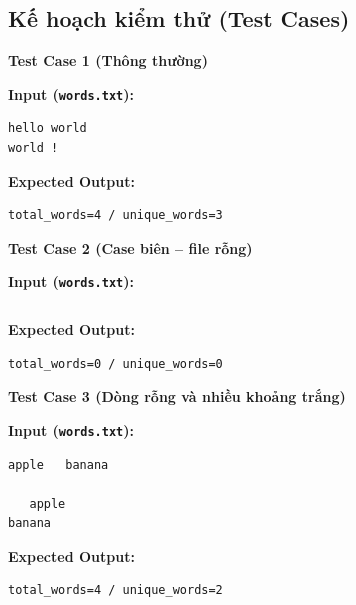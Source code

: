 \subsection{Kế hoạch kiểm thử (Test Cases)}


\textbf{Test Case 1 (Thông thường)}

\textbf{Input (\texttt{words.txt}):}
\begin{lstlisting}
hello world
world !\end{lstlisting}

\textbf{Expected Output:}
\begin{lstlisting}
total_words=4 / unique_words=3
\end{lstlisting}

\vspace{0.5cm}

\textbf{Test Case 2 (Case biên -- file rỗng)}

\textbf{Input (\texttt{words.txt}):}
\begin{lstlisting}
\end{lstlisting}

\textbf{Expected Output:}
\begin{lstlisting}
total_words=0 / unique_words=0
\end{lstlisting}

\vspace{0.5cm}

\textbf{Test Case 3 (Dòng rỗng và nhiều khoảng trắng)}

\textbf{Input (\texttt{words.txt}):}
\begin{lstlisting}
apple   banana

   apple
banana
\end{lstlisting}

\textbf{Expected Output:}
\begin{lstlisting}
total_words=4 / unique_words=2
\end{lstlisting}